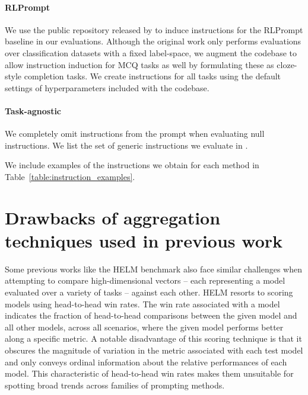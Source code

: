 \paragraph{RLPrompt} We use the public repository released by \citet{rlprompt} to induce instructions for the RLPrompt baseline in our evaluations. Although the original work only performs evaluations over classification datasets with a fixed label-space, we augment the codebase to allow instruction induction for MCQ tasks as well by formulating these as cloze-style completion tasks. We create instructions for all tasks  using the default settings of hyperparameters included with the codebase.

\paragraph{Task-agnostic} We completely omit instructions from the prompt when evaluating null instructions. We list the set of generic instructions we evaluate in .


We include examples of the instructions we obtain for each method in Table~\ref{table:instruction_examples}.

\section{Drawbacks of aggregation techniques used in previous work}
\label{app:scoring}
Some previous works like the HELM \cite{helm} benchmark also face similar challenges when attempting to compare high-dimensional vectors -- each representing a model evaluated over a variety of tasks -- against each other. HELM resorts to scoring models using head-to-head win rates. The win rate associated with a model indicates the fraction of head-to-head comparisons between the given model and all other models, across all scenarios, where the given model performs better along a specific metric. A notable disadvantage of this scoring technique is that it obscures the magnitude of variation in the metric associated with each test model and only conveys ordinal information about the relative performances of each model. This characteristic of head-to-head win rates makes them unsuitable for spotting broad trends across families of prompting methods.


